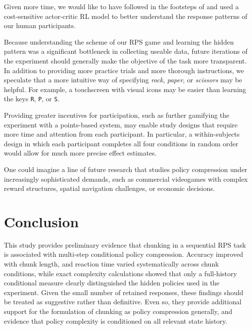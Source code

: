 \documentclass[11pt]{article}
\begin{document}
Given more time, we would like to have followed in the footsteps of \citet{lai2025action} and used a cost-sensitive actor-critic RL model to better understand the response patterns of our human participants.

Because understanding the scheme of our RPS game and learning the hidden pattern was a significant bottleneck in collecting useable data, future iterations of the experiment should generally make the objective of the task more transparent. In addition to providing more practice trials and more thorough instructions, we speculate that a more intuitive way of specifying \emph{rock}, \emph{paper}, or \emph{scissors} may be helpful. For example, a touchscreen with visual icons may be easier than learning the keys \texttt{R}, \texttt{P}, or \texttt{S}.

Providing greater incentives for participation, such as further gamifying the experiment with a points-based system, may enable study designs that require more time and attention from each participant. In particular, a within-subjects design in which each participant completes all four conditions in random order would allow for much more precise effect estimates.

One could imagine a line of future research that studies policy compression under increasingly sophisticated demands, such as commercial videogames with complex reward structures, spatial navigation challenges, or economic decisions.

\section{Conclusion}

This study provides preliminary evidence that chunking in a sequential RPS task is associated with multi-step conditional policy compression. Accuracy improved with chunk length, and reaction time varied systematically across chunk conditions, while exact complexity calculations showed that only a full-history conditional measure clearly distinguished the hidden policies used in the experiment. Given the small number of retained responses, these findings should be treated as suggestive rather than definitive. Even so, they provide additional support for the formulation of chunking as policy compression generally, and evidence that policy complexity is conditioned on all relevant state history.

\newpage 


\end{document}
